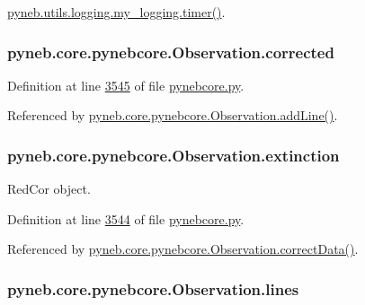\hyperlink{logging_8py_source_l00115}{pyneb.\-utils.\-logging.\-my\-\_\-logging.\-timer()}.

\hypertarget{classpyneb_1_1core_1_1pynebcore_1_1_observation_a7eef3176d082009fa850a9d364d44625}{
\subsubsection[{corrected}]{\setlength{\rightskip}{0pt plus 5cm}pyneb.\-core.\-pynebcore.\-Observation.\-corrected}}\label{classpyneb_1_1core_1_1pynebcore_1_1_observation_a7eef3176d082009fa850a9d364d44625}


Definition at line \hyperlink{pynebcore_8py_source_l03545}{3545} of file \hyperlink{pynebcore_8py_source}{pynebcore.\-py}.



Referenced by \hyperlink{pynebcore_8py_source_l03558}{pyneb.\-core.\-pynebcore.\-Observation.\-add\-Line()}.

\hypertarget{classpyneb_1_1core_1_1pynebcore_1_1_observation_acdd6227c32bd92ec4a15b83110bcb570}{
\subsubsection[{extinction}]{\setlength{\rightskip}{0pt plus 5cm}pyneb.\-core.\-pynebcore.\-Observation.\-extinction}}\label{classpyneb_1_1core_1_1pynebcore_1_1_observation_acdd6227c32bd92ec4a15b83110bcb570}


Red\-Cor object. 



Definition at line \hyperlink{pynebcore_8py_source_l03544}{3544} of file \hyperlink{pynebcore_8py_source}{pynebcore.\-py}.



Referenced by \hyperlink{pynebcore_8py_source_l04028}{pyneb.\-core.\-pynebcore.\-Observation.\-correct\-Data()}.

\hypertarget{classpyneb_1_1core_1_1pynebcore_1_1_observation_a78332043ca9f290590edf6b8a1e5b767}{
\subsubsection[{lines}]{\setlength{\rightskip}{0pt plus 5cm}pyneb.\-core.\-pynebcore.\-Observation.\-lines}}\label{classpyneb_1_1core_1_1pynebcore_1_1_observation_a78332043ca9f290590edf6b8a1e5b767}


